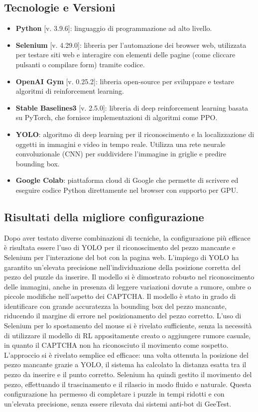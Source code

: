 \documentclass{article}
\begin{document}
\subsection{Tecnologie e Versioni}

\begin{itemize}
    \item \textbf{Python} [v. 3.9.6]: linguaggio di programmazione ad alto livello.
    \item \textbf{Selenium} [v. 4.29.0]: libreria per l’automazione dei browser web, utilizzata per testare siti web e interagire con elementi delle pagine (come cliccare pulsanti o compilare form) tramite codice.
    \item \textbf{OpenAI Gym} [v. 0.25.2]: libreria open-source per sviluppare e testare algoritmi di reinforcement learning.
    \item \textbf{Stable Baselines3} [v. 2.5.0]: libreria di deep reinforcement learning basata su PyTorch, che fornisce implementazioni di algoritmi come PPO.
    \item \textbf{YOLO}: algoritmo di deep learning per il riconoscimento e la localizzazione di oggetti in immagini e video in tempo reale. Utilizza una rete neurale convoluzionale (CNN) per suddividere l’immagine in griglie e predire bounding box.
    \item \textbf{Google Colab}: piattaforma cloud di Google che permette di scrivere ed eseguire codice Python direttamente nel browser con supporto per GPU.
\end{itemize}

\subsection{Risultati della migliore configurazione}
Dopo aver testato diverse combinazioni di tecniche, la configurazione più efficace è risultata essere l’uso di YOLO per il riconoscimento del pezzo mancante e Selenium per l’interazione del bot con la pagina web. L’impiego di YOLO ha garantito un’elevata precisione nell’individuazione della posizione corretta del pezzo del puzzle da inserire. Il modello si è dimostrato robusto nel riconoscimento delle immagini, anche in presenza di leggere variazioni dovute a rumore, ombre o piccole modifiche nell’aspetto dei CAPTCHA. Il modello è stato in grado di identificare con grande accuratezza la bounding box del pezzo mancante, riducendo il margine di errore nel posizionamento del pezzo corretto. L’uso di Selenium per lo spostamento del mouse si è rivelato sufficiente, senza la necessità di utilizzare il modello di RL appositamente creato o aggiungere rumore casuale, in quanto il CAPTCHA non ha riconosciuto il movimento come sospetto. L’approccio si è rivelato semplice ed efficace: una volta ottenuta la posizione del pezzo mancante grazie a YOLO, il sistema ha calcolato la distanza esatta tra il pezzo da inserire e il punto corretto. Selenium ha quindi gestito il movimento del pezzo, effettuando il trascinamento e il rilascio in modo fluido e naturale. Questa configurazione ha permesso di completare i puzzle in tempi ridotti e con un’elevata precisione, senza essere rilevata dai sistemi anti-bot di GeeTest.
\end{document}

